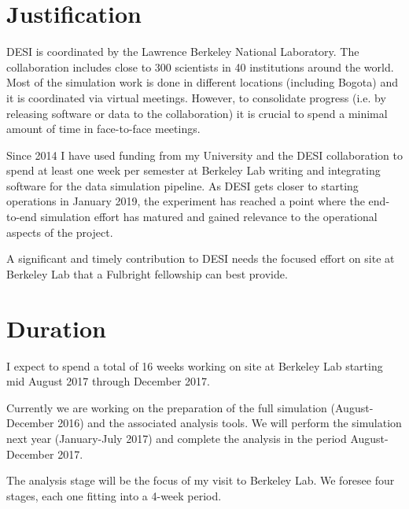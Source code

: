 \documentclass[12pt]{article}
\begin{document}
\section*{Justification}

DESI is coordinated by the Lawrence Berkeley National Laboratory. The
collaboration includes close to 300 scientists in 40 institutions
around the world. 
Most of the simulation work is done in different locations (including
Bogota) and it is coordinated via virtual meetings.  
However, to consolidate progress (i.e. by releasing software or data
to the collaboration) it is crucial to spend a minimal amount of time
in face-to-face meetings. 

Since 2014 I have used funding from my University and the DESI
collaboration to spend at least one week per semester at
Berkeley Lab writing and integrating software for the data simulation
pipeline. 
As DESI gets closer to starting operations in January 2019, the
experiment has reached a point where the end-to-end simulation effort
has matured and gained relevance to the operational aspects of the
project. 

A significant and timely contribution to DESI needs the focused effort on
site at Berkeley Lab that a Fulbright fellowship can best provide. 

\section*{Duration}

I expect to spend a total of 16 weeks working on site at Berkeley
Lab starting mid August 2017 through December 2017. 

Currently we are working on the preparation of the full simulation
(August-December 2016) and the associated analysis tools. We will
perform the simulation next year (January-July 2017) and complete the
analysis in the period August-December 2017.  

The analysis stage will be the focus of my visit
to Berkeley Lab.
We foresee four stages, each one fitting into a 4-week period.
\end{document}
